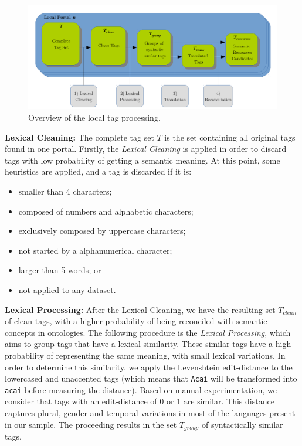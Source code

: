 \begin{figure}[tb]
\begin{center}
\includegraphics[width=\columnwidth]{images/local_processing.pdf}
\caption[Overview of the local tag processing.]{Overview of the local tag processing.}
\label{fig:local_processing}
\end{center}
\end{figure}

\noindent \textbf{Lexical Cleaning: }The complete tag set $T$ is the set containing all original tags found in one portal.
Firstly, the \emph{Lexical Cleaning} is applied in order to discard tags with low probability of getting a semantic meaning.
At this point, some heuristics are applied, and a tag is discarded if it is: 
\begin{itemize}
	\item smaller than 4 characters; 
	\item composed of numbers and alphabetic characters;
	\item exclusively composed by uppercase characters;
	\item not started by a alphanumerical character;
	\item larger than 5 words; or
	\item not applied to any dataset.
\end{itemize}

\noindent \textbf{Lexical Processing:} After the Lexical Cleaning, we have the resulting set $T_{clean}$ of clean tags, with a higher probability of being reconciled with semantic concepts in ontologies.
The following procedure is the \emph{Lexical Processing}, which aims to group tags that have a lexical similarity.
These similar tags have a high probability of representing the same meaning, with small lexical variations.
In order to determine this similarity, we apply the Levenshtein edit-distance to the lowercased and unaccented tags (which means that \texttt{Açaí} will be transformed into \texttt{acai} before measuring the distance).
Based on manual experimentation, we consider that tags with an edit-distance of 0 or 1 are similar.
This distance captures plural, gender and temporal variations in most of the languages present in our sample.
The proceeding results in the set $T_{group}$ of syntactically similar tags.

